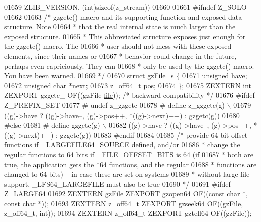 \begin{DoxyCode}
01659 \textcolor{preprocessor}{                      ZLIB\_VERSION, (int)sizeof(z\_stream))}
01660 
01661 \textcolor{preprocessor}{#ifndef Z\_SOLO}
01662 
01663 \textcolor{comment}{/* gzgetc() macro and its supporting function and exposed data structure.  Note}
01664 \textcolor{comment}{ * that the real internal state is much larger than the exposed structure.}
01665 \textcolor{comment}{ * This abbreviated structure exposes just enough for the gzgetc() macro.  The}
01666 \textcolor{comment}{ * user should not mess with these exposed elements, since their names or}
01667 \textcolor{comment}{ * behavior could change in the future, perhaps even capriciously.  They can}
01668 \textcolor{comment}{ * only be used by the gzgetc() macro.  You have been warned.}
01669 \textcolor{comment}{ */}
01670 \textcolor{keyword}{struct }\hyperlink{structgz_file__s}{gzFile\_s} \{
01671     \textcolor{keywordtype}{unsigned} have;
01672     \textcolor{keywordtype}{unsigned} \textcolor{keywordtype}{char} *next;
01673     z\_off64\_t pos;
01674 \};
01675 ZEXTERN \textcolor{keywordtype}{int} ZEXPORT gzgetc\_ OF((gzFile \hyperlink{structfile}{file}));  \textcolor{comment}{/* backward compatibility */}
01676 \textcolor{preprocessor}{#ifdef Z\_PREFIX\_SET}
01677 \textcolor{preprocessor}{#  undef z\_gzgetc}
01678 \textcolor{preprocessor}{#  define z\_gzgetc(g) \(\backslash\)}
01679 \textcolor{preprocessor}{          ((g)->have ? ((g)->have--, (g)->pos++, *((g)->next)++) : gzgetc(g))}
01680 \textcolor{preprocessor}{#else}
01681 \textcolor{preprocessor}{#  define gzgetc(g) \(\backslash\)}
01682 \textcolor{preprocessor}{          ((g)->have ? ((g)->have--, (g)->pos++, *((g)->next)++) : gzgetc(g))}
01683 \textcolor{preprocessor}{#endif}
01684 
01685 \textcolor{comment}{/* provide 64-bit offset functions if \_LARGEFILE64\_SOURCE defined, and/or}
01686 \textcolor{comment}{ * change the regular functions to 64 bits if \_FILE\_OFFSET\_BITS is 64 (if}
01687 \textcolor{comment}{ * both are true, the application gets the *64 functions, and the regular}
01688 \textcolor{comment}{ * functions are changed to 64 bits) -- in case these are set on systems}
01689 \textcolor{comment}{ * without large file support, \_LFS64\_LARGEFILE must also be true}
01690 \textcolor{comment}{ */}
01691 \textcolor{preprocessor}{#ifdef Z\_LARGE64}
01692    ZEXTERN gzFile ZEXPORT gzopen64 OF((\textcolor{keyword}{const} \textcolor{keywordtype}{char} *, \textcolor{keyword}{const} \textcolor{keywordtype}{char} *));
01693    ZEXTERN z\_off64\_t ZEXPORT gzseek64 OF((gzFile, z\_off64\_t, \textcolor{keywordtype}{int}));
01694    ZEXTERN z\_off64\_t ZEXPORT gztell64 OF((gzFile));

\end{DoxyCode}

